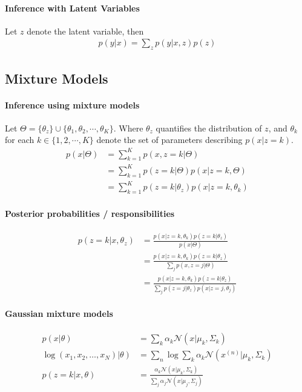 \documentclass{article}
\begin{document}
	\paragraph{Inference with Latent Variables} Let $z$ denote the latent variable, then
	\begin{align}
		p(y | x)=\sum_{z} p(y | x, z) p(z)
	\end{align}
	
	\subsection{Mixture Models}
	
	\paragraph{Inference using mixture models} Let $\Theta = \{\theta_z\} \cup \{ \theta_1, \theta_2, \cdots, \theta_K \}$. Where $\theta_z$ quantifies the distribution of $z$, and $\theta_k$ for each $k \in \{1,2,\cdots,K\}$ denote the set of parameters describing $p(x|z=k)$.
	\begin{align}
		p(x | \Theta) &= \sum_{k=1}^K p(x, z=k|\Theta) \\
		&= \sum_{k=1}^K p(z=k|\Theta) p(x|z=k, \Theta) \\
		&= \sum_{k=1}^{K} p\left(z=k | \theta_{z}\right) p\left(x | z=k, \theta_{k}\right)
	\end{align}
	
	\paragraph{Posterior probabilities / responsibilities}
	\begin{align}
		p\left(z=k | x, \theta_{z}\right)
		&= \frac{p\left(x |z=k, \theta_k \right) p\left(z=k | \theta_{z}\right)
		}{p(x|\Theta)} \\
		&=\frac{p\left(x |z=k, \theta_k \right) p\left(z=k | \theta_{z}\right)
		}{\sum_{j} p(x, z = j | \Theta )} \\
		&=\frac{p\left(x |z=k, \theta_k \right) p\left(z=k | \theta_{z}\right)
		}{\sum_{j} p\left(z=j | \theta_{z}\right) p \left(x |z=j, \theta_{j}\right)}
	\end{align}
	
	\paragraph{Gaussian mixture models}
	\begin{align}
		p(x | \theta)&=\sum_{k} \alpha_{k} \mathcal{N}\left(x | \mu_{k}, \Sigma_{k}\right) \\
		\left.\log \left(x_{1}, x_{2}, \ldots, x_{N}\right) | \theta\right)&=\sum_{n} \log \sum_{k} \alpha_{k} \mathcal{N}(x^{(n)} | \mu_{k}, \Sigma_{k}) \\
		p(z=k | x, \theta)&=\frac{\alpha_{k} \mathcal{N}\left(x | \mu_{k}, \Sigma_{k}\right)}{\sum_{j} \alpha_{j} \mathcal{N}\left(x | \mu_{j}, \Sigma_{j}\right)}
	\end{align}
	
\end{document}
